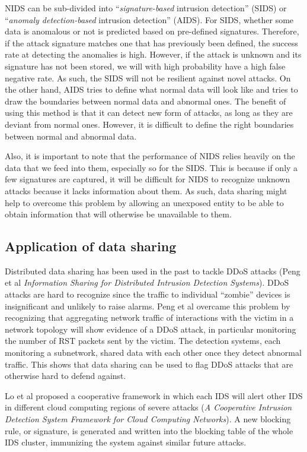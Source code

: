\begin{background}
NIDS can be sub-divided into ``\textit{signature-based} intrusion detection'' (SIDS) or ``\textit{anomaly detection-based} intrusion detection'' (AIDS). For SIDS, whether some data is anomalous or not is predicted based on pre-defined signatures. Therefore, if the attack signature matches one that has previously been defined, the success rate at detecting the anomalies is high. However, if the attack is unknown and its signature has not been stored, we will with high probability have a high false negative rate. As such, the SIDS will not be resilient against novel attacks. On the other hand, AIDS tries to define what normal data will look like and tries to draw the boundaries between normal data and abnormal ones. The benefit of using this method is that it can detect new form of attacks, as long as they are deviant from normal ones. However, it is difficult to define the right boundaries between normal and abnormal data.

Also, it is important to note that the performance of NIDS relies heavily on the data that we feed into them, especially so for the SIDS. This is because if only a few signatures are captured, it will be difficult for NIDS to recognize unknown attacks because it lacks information about them. As such, data sharing might help to overcome this problem by allowing an unexposed entity to be able to obtain information that will otherwise be unavailable to them.


\subsection{Application of data sharing}
Distributed data sharing has been used in the past to tackle DDoS attacks (Peng et al \textit{Information Sharing for Distributed Intrusion Detection Systems}). DDoS attacks are hard to recognize since the traffic to individual ``zombie'' devices is insignificant and unlikely to raise alarms. Peng et al overcame this problem by recognizing that aggregating network traffic of interactions with the victim in a network topology will show evidence of a DDoS attack, in particular monitoring the number of RST packets sent by the victim. The detection systems, each monitoring a subnetwork, shared data with each other once they detect abnormal traffic. This shows that data sharing can be used to flag DDoS attacks that are otherwise hard to defend against.

Lo et al proposed a cooperative framework in which each IDS will alert other IDS in different cloud computing regions of severe attacks (\textit{A Cooperative Intrusion Detection System Framework for Cloud Computing Networks}). A new blocking rule, or signature, is generated and written into the blocking table of the whole IDS cluster, immunizing the system against similar future attacks.


\end{background}
